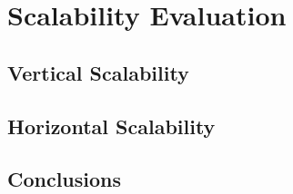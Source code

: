 \chapter{Scalability Evaluation}
\label{cap:avaliacao}


\section{Vertical Scalability}
\label{sec:vertical_escalabilidade}


\section{Horizontal Scalability}
\label{sec:horizontal_escalabilidade}

\section{Conclusions}
\label{sec:conclusions}